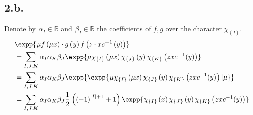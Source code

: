 \documentclass{article}
\newcommand{\Chi}[1]{\chi_{ \left\{ #1  \right\} } }
\begin{document}
\subsection{2.b.} 
Denote by $\alpha_{I} \in \mathbb{R}$ and $\beta_{I} \in \mathbb{R}$ the coefficients of $f,g$ over the character $\Chi{I}$.  
\begin{equation*}
  \begin{split}
    & \expp{\mu f\left( \mu x \right) \cdot g\left( y \right)f\left(z \cdot x c^{-1}\left( y \right)  \right)} \\
    & = \sum_{I,J,K}\alpha_{I}\alpha_{K}\beta_{J}\expp{ \mu \Chi{I}\left( \mu x \right)\Chi{J}\left( y \right) \Chi{K}\left( zx c^{-1}(y) \right) } \\
    & = \sum_{I,J,K}\alpha_{I}\alpha_{K}\beta_{J}\expp{\expp{ \mu \Chi{I}\left( \mu x \right)\Chi{J}\left( y \right) \Chi{K}\left( zx c^{-1}(y) \right)|\mu}} \\ 
    & = \sum_{I,J,K}\alpha_{I}\alpha_{K}\beta_{J}\frac{1}{2}\left( \left( - 1 \right)^{|I|+1}  + 1\right) \expp{  \Chi{I}\left(  x \right)\Chi{J}\left( y \right) \Chi{K}\left( zx c^{-1}(y) \right) }  
  \end{split}
\end{equation*}
\end{document}
